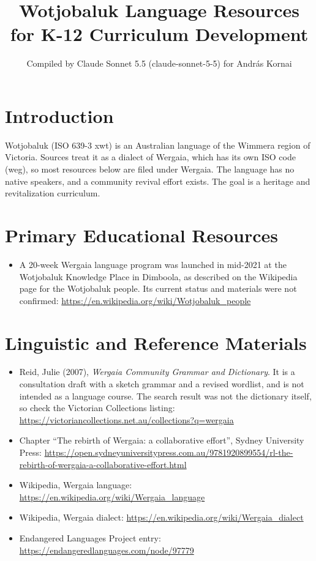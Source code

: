 \documentclass[12pt]{article}
\title{Wotjobaluk Language Resources for K-12 Curriculum Development}
\author{Compiled by Claude Sonnet 5.5 (claude-sonnet-5-5) for Andr\'as Kornai}
\date{}
\begin{document}
\maketitle

\section{Introduction}
Wotjobaluk (ISO 639-3 xwt) is an Australian language of the Wimmera region of Victoria. Sources treat it as a dialect of Wergaia, which has its own ISO code (weg), so most resources below are filed under Wergaia. The language has no native speakers, and a community revival effort exists. The goal is a heritage and revitalization curriculum.

\section{Primary Educational Resources}
\begin{itemize}
\item A 20-week Wergaia language program was launched in mid-2021 at the Wotjobaluk Knowledge Place in Dimboola, as described on the Wikipedia page for the Wotjobaluk people. Its current status and materials were not confirmed: \url{https://en.wikipedia.org/wiki/Wotjobaluk_people}
\end{itemize}

\section{Linguistic and Reference Materials}
\begin{itemize}
\item Reid, Julie (2007), \emph{Wergaia Community Grammar and Dictionary}. It is a consultation draft with a sketch grammar and a revised wordlist, and is not intended as a language course. The search result was not the dictionary itself, so check the Victorian Collections listing: \url{https://victoriancollections.net.au/collections?q=wergaia}
\item Chapter ``The rebirth of Wergaia: a collaborative effort'', Sydney University Press: \url{https://open.sydneyuniversitypress.com.au/9781920899554/rl-the-rebirth-of-wergaia-a-collaborative-effort.html}
\item Wikipedia, Wergaia language: \url{https://en.wikipedia.org/wiki/Wergaia_language}
\item Wikipedia, Wergaia dialect: \url{https://en.wikipedia.org/wiki/Wergaia_dialect}
\item Endangered Languages Project entry: \url{https://endangeredlanguages.com/node/97779}
\end{itemize}
\end{document}
